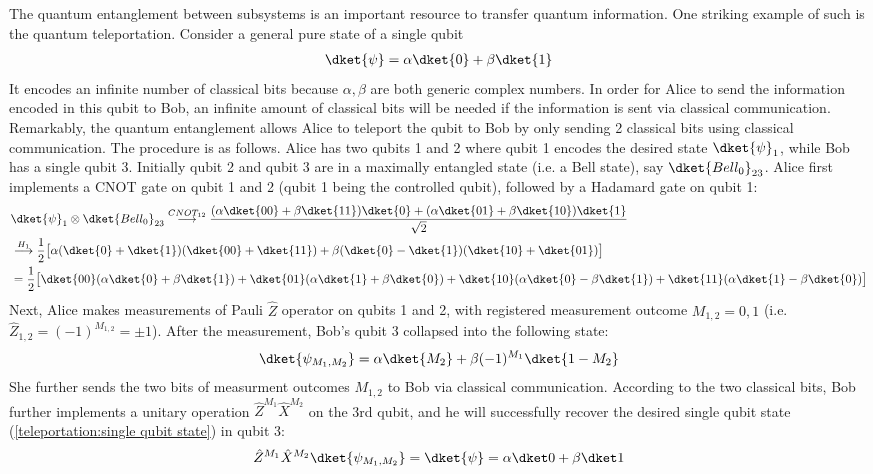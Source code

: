 The quantum entanglement between subsystems is an important resource to transfer quantum information. One striking example of such is the quantum teleportation. Consider a general pure state of a single qubit
\begin{align}\label{teleportation:single qubit state}
\dket{\psi}=\alpha\dket{0}+\beta\dket{1}
\end{align}
It encodes an infinite number of classical bits because $\alpha,\beta$ are both generic complex numbers. In order for Alice to send the information encoded in this qubit to Bob, an infinite amount of classical bits will be needed if the information is sent via classical communication. Remarkably, the quantum entanglement allows Alice to teleport the qubit to Bob by only sending 2 classical bits using classical communication. The procedure is as follows. Alice has two qubits 1 and 2 where qubit 1 encodes the desired state $\dket{\psi}_1$, while Bob has a single qubit 3. Initially qubit 2 and qubit 3 are in a maximally entangled state (i.e. a Bell state), say $\dket{Bell_0}_{23}$. Alice first implements a CNOT gate on qubit 1 and 2 (qubit 1 being the controlled qubit), followed by a Hadamard gate on qubit 1:
\begin{align}
&\dket{\psi}_1\otimes\dket{Bell_0}_{23}\overset{CNOT_{12}}\longrightarrow\frac{(\alpha\dket{00}+\beta\dket{11})\dket{0}+(\alpha\dket{01}+\beta\dket{10})\dket{1}}{\sqrt2}\\
&\overset{H_1}\longrightarrow\frac12\big[\alpha(\dket{0}+\dket{1})(\dket{00}+\dket{11})+\beta(\dket{0}-\dket{1})(\dket{10}+\dket{01})\big]\\
&=\frac12\big[\dket{00}(\alpha\dket{0}+\beta\dket{1})+\dket{01}(\alpha\dket{1}+\beta\dket{0})+\dket{10}(\alpha\dket{0}-\beta\dket{1})+\dket{11}(\alpha\dket{1}-\beta\dket{0})\big]
\end{align}
Next, Alice makes measurements of Pauli $\hat Z$ operator on qubits 1 and 2, with registered measurement outcome $M_{1,2}=0,1$ (i.e. $\hat Z_{1,2}=(-1)^{M_{1,2}}=\pm1$). After the measurement, Bob's qubit 3 collapsed into the following state:
\begin{align}
\dket{\psi_{M_1,M_2}}=\alpha\dket{M_2}+\beta(-1)^{M_1}\dket{1-M_2}
\end{align}
She further sends the two bits of measurment outcomes $M_{1,2}$ to Bob via classical communication. According to the two classical bits, Bob further implements a unitary operation $\hat Z^{M_1}\hat X^{M_2}$ on the 3rd qubit, and he will successfully recover the desired single qubit state (\ref{teleportation:single qubit state}) in qubit 3:
\begin{align}
\hat Z^{M_1}\hat X^{M_2}\dket{\psi_{M_1,M_2}}=\dket{\psi}=\alpha\dket0+\beta\dket1
\end{align}
